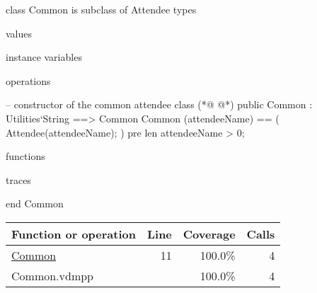 \begin{vdmpp}[breaklines=true]
class Common is subclass of Attendee
types

values

instance variables

operations

 -- constructor of the common attendee class 
(*@
\label{Common:11}
@*)
 public Common : Utilities`String ==> Common
     Common (attendeeName) == (
      Attendee(attendeeName); 
     )
     pre len attendeeName > 0;

functions

traces

end Common
\end{vdmpp}
\bigskip
\begin{longtable}{|l|r|r|r|}
\hline
Function or operation & Line & Coverage & Calls \\
\hline
\hline
\hyperref[Common:11]{Common} & 11&100.0\% & 4 \\
\hline
\hline
Common.vdmpp & & 100.0\% & 4 \\
\hline
\end{longtable}

